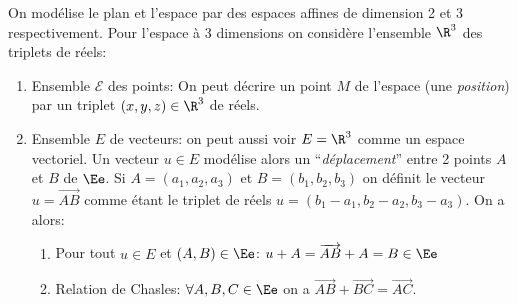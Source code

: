 On modélise le plan et l'espace par des espaces affines de dimension 2 et 3 respectivement. Pour l'espace à 3 dimensions on considère l'ensemble $\R^3$ des triplets de réels:
\begin{enumerate}
	\item Ensemble $\mathcal E$ des points: On peut décrire un point $M$ de l'espace (\ie une \emph{position}) par un triplet $(x,y,z)\in\R^3$ de réels. 

\sld{\vfill\pagebreak[5]}%

	\item Ensemble $E$ de vecteurs:  on peut aussi voir $E=\R^3$ comme un espace vectoriel. Un vecteur $u\in E$ modélise alors un ``\emph{déplacement}'' entre 2 points $A$ et $B$ de $\Ee$. Si $A = (a_1,a_2,a_3)$ et $B=(b_1,b_2,b_3)$ on définit le vecteur $u = \overrightarrow{AB}$ comme étant le triplet de réels $u = (b_1-a_1,b_2-a_2,b_3-a_3)$. %
On a alors: 
		\begin{enumerate}
			\item Pour tout $u \in E$ et $(A,B) \in \Ee$: $u +A = \overrightarrow{AB} + A = B \in \Ee$
				\pl{\rep{3cm}\pagebreak[4]}
\sld{\vfill\pagebreak[5]}%
			\item Relation de Chasles: $\forall A,B,C \in \Ee$ on a $\overrightarrow{AB} + \overrightarrow{BC} = \overrightarrow{AC}$.
\end{enumerate}
\end{enumerate}
